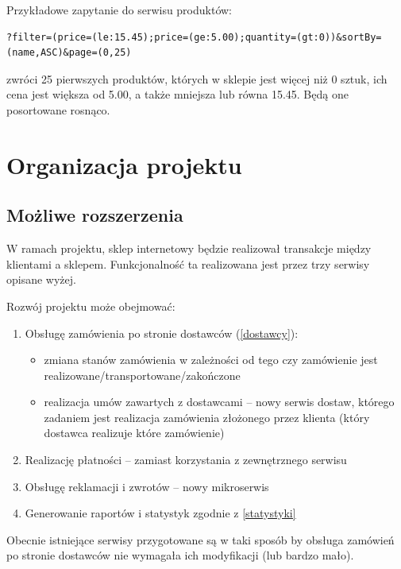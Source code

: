 \documentclass[11pt,a4paper,twoside]{article}
\begin{document}
Przykładowe zapytanie do serwisu produktów:
\begin{lstlisting}
?filter=(price=(le:15.45);price=(ge:5.00);quantity=(gt:0))&sortBy=(name,ASC)&page=(0,25)
\end{lstlisting}
\vspace{-20pt}
zwróci 25 pierwszych produktów, których w sklepie jest więcej niż 0 sztuk, ich cena jest większa od 5.00, a także mniejsza lub równa 15.45. Będą one posortowane rosnąco.



\section{Organizacja projektu}

\subsection{Możliwe rozszerzenia}
W ramach projektu, sklep internetowy będzie realizował transakcje między klientami a sklepem. Funkcjonalność ta realizowana jest przez trzy serwisy opisane wyżej.

Rozwój projektu może obejmować:
\begin{enumerate}
\item Obsługę zamówienia po stronie dostawców (\ref{dostawcy}):
\begin{itemize}
\item zmiana stanów zamówienia w zależności od tego czy zamówienie jest realizowane/transportowane/zakończone
\item realizacja umów zawartych z dostawcami -- nowy serwis dostaw, którego zadaniem jest realizacja zamówienia złożonego przez klienta (który dostawca realizuje które zamówienie)
\end{itemize}
\item Realizację płatności -- zamiast korzystania z zewnętrznego serwisu
\item Obsługę reklamacji i zwrotów -- nowy mikroserwis
\item Generowanie raportów i statystyk zgodnie z \ref{statystyki}
\end{enumerate}

Obecnie istniejące serwisy przygotowane są w taki sposób by obsługa zamówień po stronie dostawców nie wymagała ich modyfikacji (lub bardzo mało).

\end{document}
